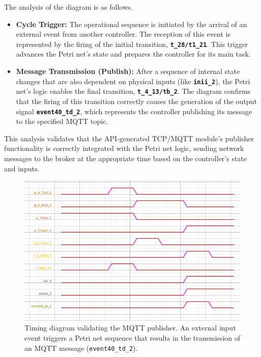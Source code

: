 The analysis of the diagram is as follows.
\begin{itemize}
    \item \textbf{Cycle Trigger:} The operational sequence is initiated by the arrival of an external event from another controller. The reception of this event is represented by the firing of the initial transition, \textbf{\texttt{t\_28/t1\_21}}. This trigger advances the Petri net's state and prepares the controller for its main task.

    \item \textbf{Message Transmission (Publish):} After a sequence of internal state changes that are also dependent on physical inputs (like \textbf{\texttt{inii\_2}}), the Petri net's logic enables the final transition, \textbf{\texttt{t\_4\_13/tb\_2}}. The diagram confirms that the firing of this transition correctly causes the generation of the output signal \textbf{\texttt{event40\_td\_2}}, which represents the controller publishing its message to the specified MQTT topic.
\end{itemize}

This analysis validates that the API-generated TCP/MQTT module's publisher functionality is correctly integrated with the Petri net logic, sending network messages to the broker at the appropriate time based on the controller's state and inputs.

\begin{figure}[htb!]
    \centering
    \includegraphics[width=\columnwidth]{Chapters/Figures/timing_diagram_tcp.png}
    \caption{Timing diagram validating the MQTT publisher. An external input event triggers a Petri net sequence that results in the transmission of an MQTT message (\texttt{event40\_td\_2}).}
    \label{fig:timing_diagram_tcp}
\end{figure}

